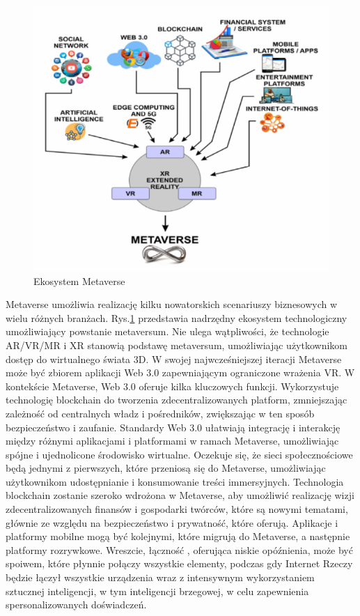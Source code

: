 \begin{figure}[!htbp]
    \centering
    \includegraphics[width=\textwidth]{images/metaverse/metaverseEcosystem.png}
    \caption{Ekosystem Metaverse\cite{metaverseSecurityIssuesChallengesAndViableZTAModel}}
    \label{metaverseEcosystemImage}
\end{figure}

Metaverse umożliwia realizację kilku nowatorskich scenariuszy biznesowych w wielu różnych branżach. Rys.\ref{metaverseEcosystemImage} przedstawia nadrzędny ekosystem technologiczny umożliwiający powstanie metaversum. Nie ulega wątpliwości, że technologie AR/VR/MR i XR stanowią podstawę metaversum, umożliwiając użytkownikom dostęp do wirtualnego świata 3D. W swojej najwcześniejszej iteracji Metaverse może być zbiorem aplikacji Web 3.0 zapewniającym ograniczone wrażenia VR. W kontekście Metaverse, Web 3.0 oferuje kilka kluczowych funkcji. Wykorzystuje technologię blockchain do tworzenia zdecentralizowanych platform, zmniejszając zależność od centralnych władz i pośredników, zwiększając w ten sposób bezpieczeństwo i zaufanie. Standardy Web 3.0 ułatwiają integrację i interakcję między różnymi aplikacjami i platformami w ramach Metaverse, umożliwiając spójne i ujednolicone środowisko wirtualne. Oczekuje się, że sieci społecznościowe będą jednymi z pierwszych, które przeniosą się do Metaverse, umożliwiając użytkownikom udostępnianie i konsumowanie treści immersyjnych. Technologia blockchain zostanie szeroko wdrożona w Metaverse, aby umożliwić realizację wizji zdecentralizowanych finansów i gospodarki twórców, które są nowymi tematami, głównie ze względu na bezpieczeństwo i prywatność, które oferują. Aplikacje i platformy mobilne mogą być kolejnymi, które migrują do Metaverse, a następnie platformy rozrywkowe. Wreszcie, łączność , oferująca niskie opóźnienia, może być spoiwem, które płynnie połączy wszystkie elementy, podczas gdy Internet Rzeczy będzie łączył wszystkie urządzenia wraz z intensywnym wykorzystaniem sztucznej inteligencji, w tym inteligencji brzegowej, w celu zapewnienia spersonalizowanych doświadczeń\cite{metaverseSecurityIssuesChallengesAndViableZTAModel}.


